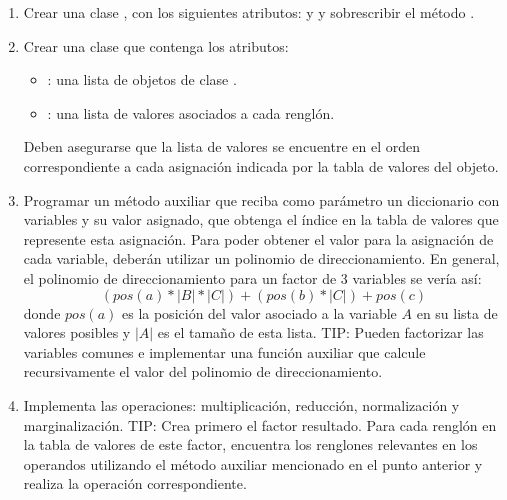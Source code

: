 \begin{enumerate}
  \item Crear una clase , con los siguientes atributos:  y  y sobrescribir el método .
  \item Crear una clase  que contenga los atributos: 
    \begin{itemize}
      \item {}: una lista de objetos de clase .
      \item {}: una lista de valores asociados a cada renglón.
    \end{itemize}
  Deben asegurarse que la lista de valores se encuentre en el orden correspondiente a cada asignación indicada por la tabla de valores del objeto.
  \item Programar un método auxiliar que reciba como parámetro un diccionario con variables y su valor asignado, que obtenga el índice en la tabla de valores que represente esta asignación. Para poder obtener el valor para la asignación de cada variable, deberán utilizar un polinomio de direccionamiento. En general, el polinomio de direccionamiento para un factor de 3 variables se vería así:
      \[(pos(a) * |B| * |C|) + (pos(b) * |C|) + pos(c)\]
    donde \(pos(a)\) es la posición del valor asociado a la variable \(A\) en su lista de valores posibles y \(|A|\) es el tamaño de esta lista. TIP: Pueden factorizar las variables comunes e implementar una   función auxiliar que calcule recursivamente el valor del polinomio de direccionamiento.
  \item Implementa las operaciones: multiplicación, reducción, normalización y marginalización. TIP: Crea primero el factor resultado. Para cada renglón en la tabla de valores de este factor, encuentra los renglones relevantes en los operandos utilizando el método auxiliar mencionado en el punto anterior y realiza la operación correspondiente.
\end{enumerate}

